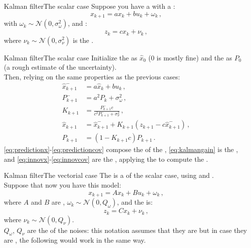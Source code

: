 \begin{frame}{Kalman filter}{The scalar case}
  Suppose you have a  with a :
  \begin{equation}
    x_{k+1} = ax_k + bu_k + \omega_k\,,
  \end{equation}
  with $\omega_k \sim \mathcal{N}(0,\sigma_{\omega}^2)$, and :
  \begin{equation}
    z_k = cx_k + \nu_k\,,
  \end{equation}
  where $\nu_k \sim \mathcal{N}(0,\sigma_{\nu}^2)$ is the .
\end{frame}
\begin{frame}{Kalman filter}{The scalar case}
  Initialize the  as $\hat{x}_0$ ($0$ is mostly fine) and the  as $P_0$ (a rough estimate of the uncertainty).\\
  Then, relying on the same properties as the previous cases:
  \begin{subequations}
    \begin{align}
      \hat{x}_{k+1}^{-} &= a\hat{x}_k + bu_k\,,\label{eq:predictionx}\\
      P_{k+1}^{-} &= a^2P_k + \sigma_{\omega}^2\,,\label{eq:predictioncov}\\
      K_{k+1} &= \frac{P_{k+1}^{-}c}{c^2P_{k+1}^{-} + \sigma_{\nu}^2}\,,\label{eq:kalmangain}\\
      \hat{x}_{k+1} &= \hat{x}_{k+1}^{-} + K_{k+1}(z_{k+1} - c\hat{x}_{k+1}^{-})\,,\label{eq:innovx}\\
      P_{k+1} &= (1 - K_{k+1}c)P_{k+1}\,.\label{eq:innovcov}
    \end{align}
  \end{subequations}
  \eqref{eq:predictionx}-\eqref{eq:predictioncov} compose the  of the , \eqref{eq:kalmangain} is the , and \eqref{eq:innovx}-\eqref{eq:innovcov} are the , applying the  to compute the .
\end{frame}
\begin{frame}{Kalman filter}{The vectorial case}
  The  is a  of the scalar case, using  and .\\
  Suppose that now you have this model:
  \begin{equation}
    x_{k+1} = Ax_k + Bu_k + \omega_k\,,
  \end{equation}
  where $A$ and $B$ are , $\omega_k \sim \mathcal{N}(0,Q_{\omega})$, and the  is:
  \begin{equation}
    z_k = Cx_k + \nu_k\,,
  \end{equation}
  where $\nu_k \sim \mathcal{N}(0,Q_{\nu})$.\\
  $Q_\omega$, $Q_\nu$ are the  of the noises: this notation assumes that they are  but in case they are , the following would work in the same way.
\end{frame}
